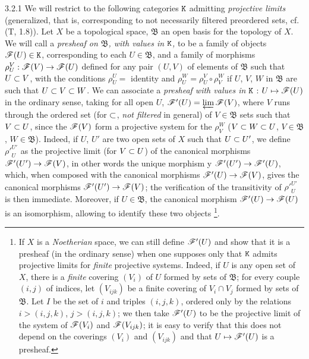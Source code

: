 \documentclass[../main.tex]{subfiles}
\begin{document}
\begin{cx}{3.2.1}
We will restrict to the following categories $\mathtt{K}$ admitting
\emph{projective limits} (generalized, that is, corresponding to not necessarily filtered preordered sets,
cf. (T, 1.8)). Let $X$ be a topological space, $\mathfrak{B}$ an open basis
for the topology of $X$. We will call a \emph{presheaf on $\mathfrak{B}$, with values in $\mathtt{K}$,} to be
a family of objects $\mathscr{F}(U)\in\mathtt{K}$, corresponding to each $U\in\mathfrak{B}$, and a family of morphisms
$\rho_U^V:\mathscr{F}(V)\to\mathscr{F}(U)$ defined for any pair $(U,V)$ of elements of $\mathfrak{B}$ such that $U\subset V$,
with the conditions $\rho_U^U=$ identity and $\rho_U^W=\rho_U^V\circ\rho_V^W$ if $U$, $V$, $W$ in
$\mathfrak{B}$ are such that $U\subset V\subset W$. We can associate a \emph{presheaf with values in} $\mathtt{K}$ : $U\mapsto\mathscr{F}(U)$
in the ordinary sense, taking for all open $U$, $\mathscr{F}'(U)=\varprojlim\mathscr{F}(V)$, where $V$ runs through
the ordered set (for $\subset$, \emph{not filtered} in general) of $V\in\mathfrak{B}$ sets such that $V\subset U$, since
the $\mathscr{F}(V)$ form a projective system for the $\rho_V^W$ ($V\subset W\subset U$, $V\in\mathfrak{B}$, $W\in\mathfrak{B}$).
Indeed, if $U$, $U'$ are two open sets of $X$ such that $U\subset U'$, we define ${\rho'}_U^{U'}$ as the
projective limit (for $V\subset U$) of the canonical morphisms $\mathscr{F}'(U')\to\mathscr{F}(V)$, in other words
the unique morphism y $\mathscr{F}'(U')\to\mathscr{F}'(U)$, which, when composed with the canonical morphisms
$\mathscr{F}'(U)\to\mathscr{F}(V)$, gives the canonical morphisms $\mathscr{F}'(U')\to\mathscr{F}(V)$; the verification of
the transitivity of ${\rho'}_U^{U'}$ is then immediate. Moreover, if $U\in\mathfrak{B}$,
the canonical morphism $\mathscr{F}'(U)\to\mathscr{F}(U)$ is an isomorphism, allowing to identify these two objects
\footnote{
If $X$ is a \emph{Noetherian} space, we can still define $\mathscr{F}'(U)$ and show that it is a presheaf (in the
ordinary sense) when one supposes only that $\mathtt{K}$ admits projective limits for \emph{finite} projective systems. Indeed,
if $U$ is any open set of $X$, there is a \emph{finite} covering $(V_i)$ of $U$ formed by sets of $\mathfrak{B}$; for every
couple $(i,j)$ of indices, let $(V_{ijk})$ be a finite covering of $V_i\cap V_j$ formed by sets of $\mathfrak{B}$. Let $I$ be the set
of $i$ and triples $(i,j,k)$, ordered only by the relations $i>(i,j,k)$, $j>(i,j,k)$; we then take $\mathscr{F}'(U)$ to be
the projective limit of the system of $\mathscr{F}(V_i)$ and $\mathscr{F}(V_{ijk})$; it is easy to verify that this does not depend on the
coverings $(V_i)$ and $(V_{ijk})$ and that $U\mapsto\mathscr{F}'(U)$ is a presheaf.}.
\end{cx}
\end{document}
